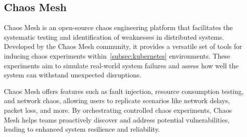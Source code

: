 \subsection{Chaos Mesh}
Chaos Mesh is an open-source chaos engineering platform that facilitates the systematic testing and identification of weaknesses in distributed systems. Developed by the Chaos Mesh community, it provides a versatile set of tools for inducing chaos experiments within~\cref{subsec:kubernetes} environments. These experiments aim to simulate real-world system failures and assess how well the system can withstand unexpected disruptions.

Chaos Mesh offers features such as fault injection, resource consumption testing, and network chaos, allowing users to replicate scenarios like network delays, packet loss, and more. By orchestrating controlled chaos experiments, Chaos Mesh helps teams proactively discover and address potential vulnerabilities, leading to enhanced system resilience and reliability. ~\cite{noauthor_chaos_nodate}